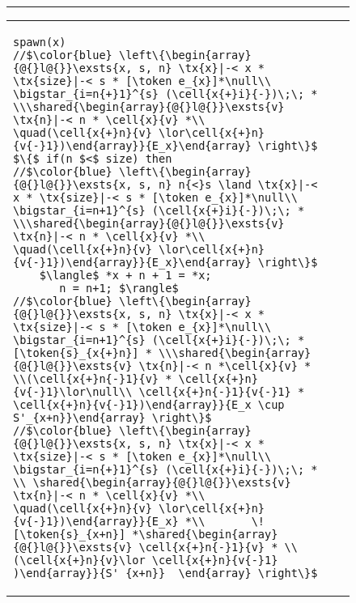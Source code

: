 \begin{figure}
\centering
\noindent\hrule
\begin{tabular}{@{} l @{\hspace{4ex}} l@{}}
{\begin{lstlisting}
spawn(x)
//$\color{blue} \left\{\begin{array}{@{}l@{}}\exsts{x, s, n} \tx{x}|-< x * \tx{size}|-< s * [\token e_{x}]*\null\\ \bigstar_{i=n{+}1}^{s} (\cell{x{+}i}{-})\;\; * \\\shared{\begin{array}{@{}l@{}}\exsts{v}  \tx{n}|-< n * \cell{x}{v} *\\ \quad(\cell{x{+}n}{v} \lor\cell{x{+}n}{v{-}1})\end{array}}{E_x}\end{array} \right\}$
$\{$ if(n $<$ size) then
//$\color{blue} \left\{\begin{array}{@{}l@{}}\exsts{x, s, n} n{<}s \land \tx{x}|-< x * \tx{size}|-< s * [\token e_{x}]*\null\\ \bigstar_{i=n+1}^{s} (\cell{x{+}i}{-})\;\; * \\\shared{\begin{array}{@{}l@{}}\exsts{v}  \tx{n}|-< n * \cell{x}{v} *\\ \quad(\cell{x{+}n}{v} \lor\cell{x{+}n}{v{-}1})\end{array}}{E_x}\end{array} \right\}$
    $\langle$ *x + n + 1 = *x;
       n = n+1; $\rangle$
//$\color{blue} \left\{\begin{array}{@{}l@{}}\exsts{x, s, n} \tx{x}|-< x * \tx{size}|-< s * [\token e_{x}]*\null\\ \bigstar_{i=n+1}^{s} (\cell{x{+}i}{-})\;\; * [\token{s}_{x{+}n}] * \\\shared{\begin{array}{@{}l@{}}\exsts{v} \tx{n}|-< n *\cell{x}{v} * \\(\cell{x{+}n{-}1}{v} * \cell{x{+}n}{v{-}1}\lor\null\\ \cell{x{+}n{-}1}{v{-}1} * \cell{x{+}n}{v{-}1})\end{array}}{E_x \cup S'_{x+n}}\end{array} \right\}$
//$\color{blue} \left\{\begin{array}{@{}l@{}}\exsts{x, s, n} \tx{x}|-< x * \tx{size}|-< s * [\token e_{x}]*\null\\ \bigstar_{i=n{+}1}^{s} (\cell{x{+}i}{-})\;\; * \\ \shared{\begin{array}{@{}l@{}}\exsts{v}  \tx{n}|-< n * \cell{x}{v} *\\ \quad(\cell{x{+}n}{v} \lor\cell{x{+}n}{v{-}1})\end{array}}{E_x} *\\       \![\token{s}_{x+n}] *\shared{\begin{array}{@{}l@{}}\exsts{v} \cell{x{+}n{-}1}{v} * \\ (\cell{x{+}n}{v}\lor \cell{x{+}n}{v{-}1} )\end{array}}{S'_{x+n}}  \end{array} \right\}$

\end{lstlisting}}
\end{tabular}
\end{figure}
